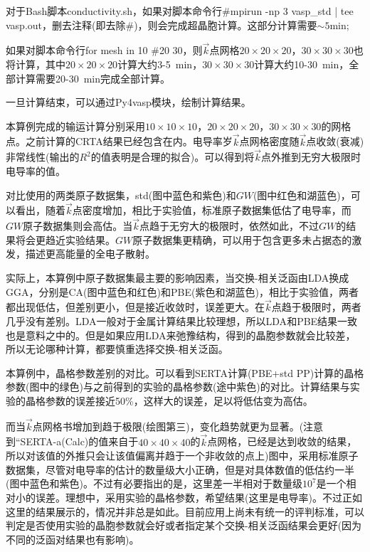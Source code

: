 {对于\textrm{Bash}脚本\textrm{conductivity.sh}，如果对脚本命令行\textrm{\#mpirun -np 3 vasp\_std | tee vasp.out}，删去注释(即去除\#)，则会完成超晶胞计算。这部分计算需要$\sim5\mathrm{min}$;

如果对脚本命令行\textrm{for mesh in 10 \#20 30}，则$\vec k$点网格$20\times20\times20$，$30\times30\times30$也将计算，其中$20\times20\times20$计算大约\textrm{3-5~min}，$30\times30\times30$计算大约\textrm{10-30~min}，全部计算需要\textrm{20-30~min}完成全部计算。

一旦计算结束，可以通过\textrm{Py4vasp}模块，绘制计算结果。

本算例完成的输运计算分别采用$10\times10\times10$，$20\times20\times20$，$30\times30\times30$的网格点。之前计算的\textrm{CRTA}结果已经包含在内。电导率岁$\vec k$点网格密度随$\vec k$点收敛(衰减)非常线性(输出的$R^2$的值表明是合理的拟合)。可以得到将$\vec k$点外推到无穷大极限时电导率的值。

对比使用的两类原子数据集，\textrm{std}(图中蓝色和紫色)和$GW$(图中红色和湖蓝色)，可以看出，随着$\vec k$点密度增加，相比于实验值，标准原子数据集低估了电导率，而$GW$原子数据集则会高估。当$\vec k$点趋于无穷大的极限时，依然如此，不过$GW$的结果将会更趋近实验结果。$GW$原子数据集更精确，可以用于包含更多未占据态的激发，描述更高能量的全电子散射。

实际上，本算例中原子数据集最主要的影响因素，当交换-相关泛函由\textrm{LDA}换成\textrm{GGA}，分别是\textrm{CA}(图中蓝色和红色)和\textrm{PBE}(紫色和湖蓝色)，相比于实验值，两者都出现低估，但差别更小，但是接近收敛时，误差更大。在$\vec k$点趋于极限时，两者几乎没有差别。\textrm{LDA}一般对于金属计算结果比较理想，所以\textrm{LDA}和\textrm{PBE}结果一致也是意料之中的。但是如果应用\textrm{LDA}来弛豫结构，得到的晶胞参数就会比较差，所以无论哪种计算，都要慎重选择交换-相关泛函。

本算例中，晶格参数差别的对比。可以看到\textrm{SERTA}计算\textrm{(PBE+std PP)}计算的晶格参数(图中的绿色)与之前得到的实验的晶格参数(途中紫色)的对比。计算结果与实验的晶格参数的误差接近\textrm{50\%}，这样大的误差，足以将低估变为高估。

而当$\vec k$点网格书增加到趋于极限(绘图第三)，变化趋势就更为显著。(注意到``\textrm{SERTA}-\textrm{a(Calc)}的值来自于$40\times40\times40$的$\vec k$点网格，已经是达到收敛的结果，所以对该值的外推只会让该值偏离并趋于一个非收敛的点上)图中，采用标准原子数据集，尽管对电导率的估计的数量级大小正确，但是对具体数值的低估约一半(图中蓝色和紫色)。不过有必要指出的是，这里差一半相对于数量级$10^7$是一个相对小的误差。理想中，采用实验的晶格参数，希望结果(这里是电导率)。不过正如这里的结果展示的，情况并非总是如此。目前应用上尚未有统一的评判标准，可以判定是否使用实验的晶胞参数就会好或者指定某个交换-相关泛函结果会更好(因为不同的泛函对结果也有影响)。

}
